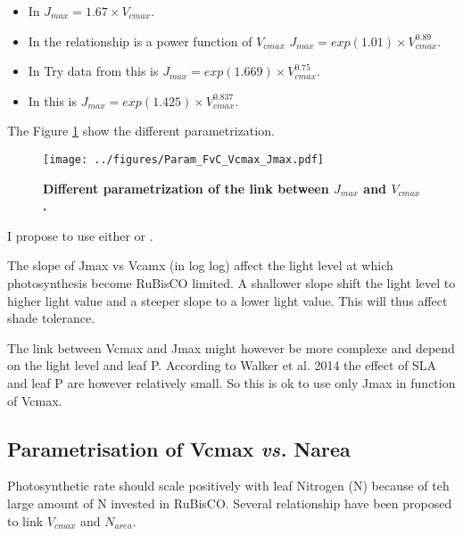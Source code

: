 \documentclass[a4paper,11pt]{article}
\begin{document}
\begin{itemize}

\item In \citet{Medlyn-2002} $J_{max} = 1.67 \times  V_{cmax}$.

\item In \citet{Walker-2014} the relationship is a power function of $V_{cmax}$ $J_{max} = exp(1.01) \times V_{cmax}^{0.89}$.

\item In Try data from \citet{Kattge-2011} this is $J_{max} = exp(1.669) \times V_{cmax}^{0.75}$.

\item In \citet{Wullschleger-1993} this is $J_{max} = exp(1.425) \times V_{cmax}^{0.837}$.

\end{itemize}

The Figure \ref{fig:Vcmax_Jmax} show the different parametrization.

\begin{figure}[ht]
\centering
\texttt{[image: ../figures/Param\_FvC\_Vcmax\_Jmax.pdf]}
\caption{\textbf{Different parametrization of the link between $J_{max}$ and $V_{cmax}$.}
\label{fig:Vcmax_Jmax}}
\end{figure}

I propose to use either \citet{Medlyn-2002} or \citet{Walker-2014}.

The slope of Jmax vs Vcamx (in log log) affect the light level at which photosynthesis become RuBisCO limited. A shallower slope shift the light level to higher light value and a steeper slope to a lower light value. This will thus affect shade tolerance.

The link between Vcmax and Jmax might however be more complexe and depend on the light level and leaf P. According to Walker et al. 2014 the effect of SLA and leaf P are however relatively small. So this is ok to use only Jmax in function of Vcmax.

\subsection{Parametrisation of Vcmax \textit{vs.} Narea}

Photosynthetic rate should scale positively with leaf Nitrogen (N) because of teh large amount of N invested in RuBisCO. Several relationship have been proposed to link $V_{cmax}$ and $N_{area}$.
\end{document}
